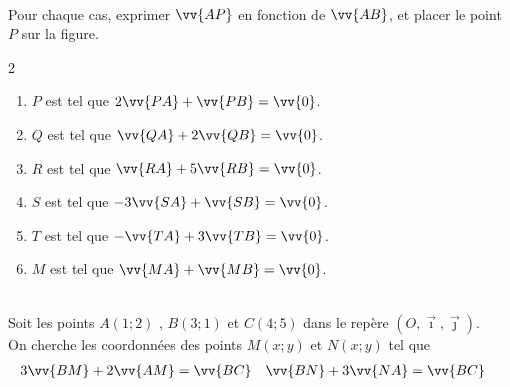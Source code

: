 \documentclass[main.tex]{subfiles}
\begin{document}
\begin{exercise}\hfill\\
Pour chaque cas, exprimer $\vv{AP}$ en fonction de $\vv{AB}$, et placer le point $P$ sur la figure.
\begin{multicols}{2}
\begin{enumerate}[label=\alph*),leftmargin=*]
\item $P$ est tel que $ 2\vv{PA}+\vv{PB}=\vv{0}$.
\item $Q$ est tel que $\vv{QA}+2\vv{QB}=\vv{0}$.
\item $R$ est tel que $\vv{RA}+5\vv{RB}=\vv{0}$.
\item $S$ est tel que $-3\vv{SA}+\vv{SB}=\vv{0}$.
\item $T$ est tel que $ -\vv{TA}+3\vv{TB}=\vv{0}$.
\item $M$ est tel que $ \vv{MA}+\vv{MB}=\vv{0}$.
\end{enumerate} 
\end{multicols}
\begin{minipage}{1\columnwidth}
\centering
{} 
\end{minipage}
\end{exercise}
%
\begin{example}\hfill \\
Soit les points $A(1;2)$ , $B(3;1)$ et $C(4;5)$ dans le repère $(O,\vec{\imath},\vec{\jmath})$.\\
On cherche les coordonnées des points $M(x;y)$ et $N(x;y)$ tel que 
\begin{align*}
3\vv{BM} +2\vv{AM}&=\vv{BC} & \vv{BN}+3\vv{NA}&=\vv{BC} 
\end{align*}  
\vfill
\end{example}  
\end{document}
